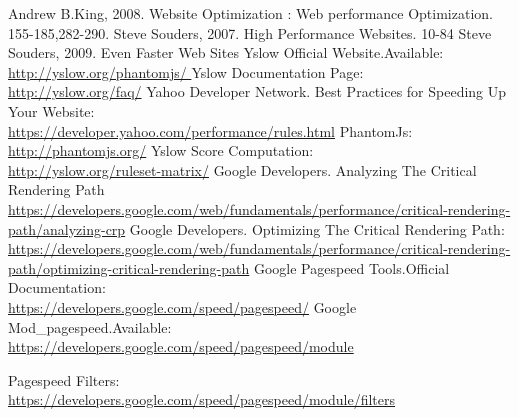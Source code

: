 \documentclass[conference]{IEEEtran}
\begin{document}
\begin{thebibliography}{1}
Andrew B.King, 2008. Website Optimization : Web performance
Optimization. 155-185,282-290.
Steve Souders, 2007.  High Performance Websites. 10-84
Steve Souders, 2009. Even Faster Web Sites 
Yslow Official Website.Available:\\
\href{http://yslow.org/phantomjs/}{http://yslow.org/phantomjs/
}
Yslow Documentation Page:\\
\href{http://yslow.org/faq/}{http://yslow.org/faq/}
Yahoo Developer Network. Best Practices for Speeding Up Your Website:\\
\href{https://developer.yahoo.com/performance/rules.html}{
https://developer.yahoo.com/performance/rules.html}
PhantomJs:\\
\href{http://phantomjs.org/}
{http://phantomjs.org/}
Yslow Score Computation:\\
\href{http://yslow.org/ruleset-matrix/}
{http://yslow.org/ruleset-matrix/}
Google Developers. Analyzing The Critical Rendering Path\\
\href{
https://developers.google.com/web/fundamentals/performance/critical-rendering-path/analyzing-crp}
{https://developers.google.com/web/fundamentals/performance/critical-rendering-path/analyzing-crp}
Google Developers. Optimizing The Critical Rendering Path:\\
\href{
https://developers.google.com/web/fundamentals/performance/critical-rendering-path/optimizing-critical-rendering-path}
{https://developers.google.com/web/fundamentals/performance/critical-rendering-path/optimizing-critical-rendering-path}
Google Pagespeed Tools.Official Documentation:\\
\href{https://developers.google.com/speed/pagespeed/}{
https://developers.google.com/speed/pagespeed/}
Google Mod\_pagespeed.Available:\\
\href{
https://developers.google.com/speed/pagespeed/module}{
https://developers.google.com/speed/pagespeed/module}
 
Pagespeed Filters:\\
\href{https://developers.google.com/speed/pagespeed/module/filters}
{https://developers.google.com/speed/pagespeed/module/filters}

\end{thebibliography}
\end{document}
